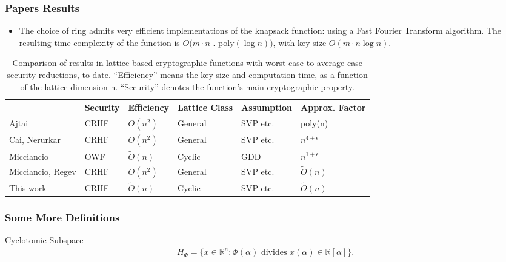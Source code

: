 \documentclass{beamer}
\begin{document}
\begin{frame}
	\frametitle{Papers Results}
	\begin{itemize}
		\item The choice of ring admits very efficient implementations of the knapsack function: using a Fast Fourier Transform algorithm. The resulting time complexity of the function is $O(m · n $ . poly$(\log n))$, with key size $O(m · n \log n)$.
	\end{itemize}
	\footnotesize{
		\begin{table}
			\begin{tabular}{|m{2cm} | m{1.3cm} | m{1.5cm} | m{1.3cm} | m{1.8cm} | m{1.5cm}|}
				\hline
				\textbf{ } & \textbf{Security} & \textbf{Efficiency} & \textbf{Lattice Class} & \textbf{Assumption} & \textbf{Approx. Factor}\\
				\hline
				Ajtai & CRHF & $O(n^2)$ & General & SVP etc. & poly(n) \\
				Cai, Nerurkar & CRHF & $O(n^2)$ & General & SVP etc. & $n^{4+\epsilon}$ \\
				Micciancio & OWF & $\tilde{O}(n)$ & Cyclic & GDD & $n^{1+\epsilon}$ \\
				Micciancio, Regev & CRHF & $O(n^2)$ & General & SVP etc. & $\tilde{O}(n)$ \\
				This work & CRHF & $\tilde{O}(n)$ & Cyclic & SVP etc. & $\tilde{O}(n)$ \\
				\hline
			\end{tabular}
			\caption{\scriptsize{Comparison of results in lattice-based cryptographic functions with worst-case to average
					case security reductions, to date. “Efficiency” means the key size and computation time, as a
					function of the lattice dimension n. “Security” denotes the function’s main cryptographic property.}}
		\end{table}
	}
\end{frame}
\begin{frame}
\frametitle{Some More Definitions}
\begin{block}{Cyclotomic Subspace}
\begin{align*}
H_\Phi = \{x \in \mathbb{R}^n:\Phi(\alpha)\text{ divides }x(\alpha) \in \mathbb{R}[\alpha]\}.
\end{align*}
\end{block}
\end{frame}
\end{document}
